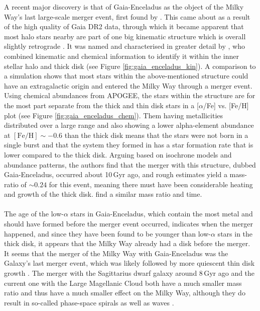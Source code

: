 \documentclass[a4paper,11pt]{article}
\begin{document}
A recent major discovery is that of Gaia-Enceladus as the object of the Milky Way's last large-scale merger event, first found by \citet{belokurov18}. This came about as a result of the high quality of Gaia DR2 data, through which it became apparent that most halo stars nearby are part of one big kinematic structure which is overall slightly retrograde \citep{koppelman18,myeong18}. It was named and characterised in greater detail by \citet{helmi18}, who combined kinematic and chemical information to identify it within the inner stellar halo and thick disk (see Figure \ref{fig:gaia_enceladus_kin}). A comparison to a simulation shows that most stars within the above-mentioned structure could have an extragalactic origin and entered the Milky Way through a merger event. Using chemical abundances from APOGEE, the stars within the structure are for the most part separate from the thick and thin disk stars in a [$\alpha$/Fe] vs. [Fe/H] plot (see Figure \ref{fig:gaia_enceladus_chem}). Them having metallicities distributed over a large range and also showing a lower alpha-element abundance at $\mathrm{[Fe/H]}\sim-0.6$ than the thick disk means that the stars were not born in a single burst and that the system they formed in has a star formation rate that is lower compared to the thick disk. Arguing based on isochrone models and abundance patterns, the authors find that the merger with this structure, dubbed Gaia-Enceladus, occurred about 10\,Gyr ago, and rough estimates yield a mass-ratio of ${\sim}0.24$ for this event, meaning there must have been considerable heating and growth of the thick disk. \citet{gallart19} find a similar mass ratio and time.\\ \\
%
The age of the low-$\alpha$ stars in Gaia-Enceladus, which contain the most metal and should have formed before the merger event occurred, indicates when the merger happened, and since they have been found to be younger than low-$\alpha$ stars in the thick disk, it appears that the Milky Way already had a disk before the merger. It seems that the merger of the Milky Way with Gaia-Enceladus was the Galaxy's last merger event, which was likely followed by more quiescent thin disk growth \citep{helmi20}. The merger with the Sagittarius dwarf galaxy around 8\,Gyr ago \citep[e.g.,][]{dierickx17} and the current one with the Large Magellanic Cloud both have a much smaller mass ratio and thus have a much smaller effect on the Milky Way, although they do result in so-called phase-space spirals as well as waves \citep{antoja18,laporte19}.
\end{document}
